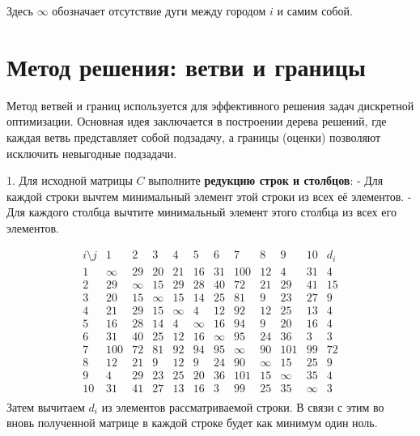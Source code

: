 \documentclass{article}
\begin{document}
Здесь $\infty$ обозначает отсутствие дуги между городом $i$ и самим собой.

\section*{Метод решения: ветви и границы}

Метод ветвей и границ используется для эффективного решения задач дискретной оптимизации. Основная идея заключается в построении дерева решений, где каждая ветвь представляет собой подзадачу, а границы (оценки) позволяют исключить невыгодные подзадачи.

1. Для исходной матрицы $C$ выполните \textbf{редукцию строк и столбцов}:
- Для каждой строки вычтем минимальный элемент этой строки из всех её элементов.
- Для каждого столбца вычтите минимальный элемент этого столбца из всех его элементов.

\[
    \begin{array}{c|cccccccccc|c}
        i \setminus j & 1      & 2      & 3      & 4      & 5      & 6      & 7      & 8      & 9      & 10     & d_i \\
        \hline
        1             & \infty & 29     & 20     & 21     & 16     & 31     & 100    & 12     & 4      & 31     & 4   \\
        2             & 29     & \infty & 15     & 29     & 28     & 40     & 72     & 21     & 29     & 41     & 15  \\
        3             & 20     & 15     & \infty & 15     & 14     & 25     & 81     & 9      & 23     & 27     & 9   \\
        4             & 21     & 29     & 15     & \infty & 4      & 12     & 92     & 12     & 25     & 13     & 4   \\
        5             & 16     & 28     & 14     & 4      & \infty & 16     & 94     & 9      & 20     & 16     & 4   \\
        6             & 31     & 40     & 25     & 12     & 16     & \infty & 95     & 24     & 36     & 3      & 3   \\
        7             & 100    & 72     & 81     & 92     & 94     & 95     & \infty & 90     & 101    & 99     & 72  \\
        8             & 12     & 21     & 9      & 12     & 9      & 24     & 90     & \infty & 15     & 25     & 9   \\
        9             & 4      & 29     & 23     & 25     & 20     & 36     & 101    & 15     & \infty & 35     & 4   \\
        10            & 31     & 41     & 27     & 13     & 16     & 3      & 99     & 25     & 35     & \infty & 3   \\
    \end{array}
\]
Затем вычитаем $d_i$ из элементов рассматриваемой строки. В связи с этим во вновь полученной матрице в каждой строке будет как минимум один ноль.
\end{document}
